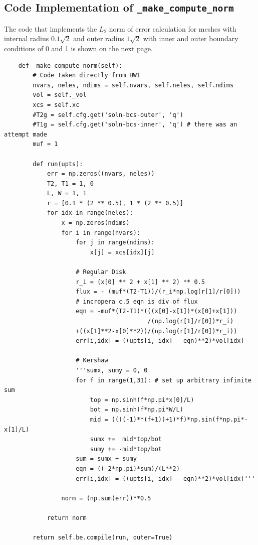 \documentclass[a4paper, 12pt]{article}
\begin{document}
\subsection{Code Implementation of \texttt{\_make\_compute\_norm}}
The code that implements the $L_2$ norm of error calculation for meshes with internal radius $0.1\sqrt{2}$ and outer radius $1\sqrt{2}$ with inner and outer boundary conditions of 0 and 1 is shown on the next page.
\begin{verbatim}
    def _make_compute_norm(self):
        # Code taken directly from HW1
        nvars, neles, ndims = self.nvars, self.neles, self.ndims
        vol = self._vol
        xcs = self.xc
        #T2g = self.cfg.get('soln-bcs-outer', 'q')
        #T1g = self.cfg.get('soln-bcs-inner', 'q') # there was an attempt made
        muf = 1

        def run(upts):
            err = np.zeros((nvars, neles))
            T2, T1 = 1, 0
            L, W = 1, 1
            r = [0.1 * (2 ** 0.5), 1 * (2 ** 0.5)]
            for idx in range(neles):
                x = np.zeros(ndims)
                for i in range(nvars):
                    for j in range(ndims):
                        x[j] = xcs[idx][j]

                    # Regular Disk
                    r_i = (x[0] ** 2 + x[1] ** 2) ** 0.5
                    flux = - (muf*(T2-T1))/(r_i*np.log(r[1]/r[0])) 
                    # incropera c.5 eqn is div of flux
                    eqn = -muf*(T2-T1)*(((x[0]-x[1])*(x[0]+x[1]))
                                        /(np.log(r[1]/r[0])*r_i)
                    +((x[1]**2-x[0]**2))/(np.log(r[1]/r[0])*r_i))
                    err[i,idx] = ((upts[i, idx] - eqn)**2)*vol[idx]

                    # Kershaw
                    '''sumx, sumy = 0, 0
                    for f in range(1,31): # set up arbitrary infinite sum
                        top = np.sinh(f*np.pi*x[0]/L)
                        bot = np.sinh(f*np.pi*W/L)
                        mid = ((((-1)**(f+1))+1)*f)*np.sin(f*np.pi*-x[1]/L)
                        sumx +=  mid*top/bot
                        sumy += -mid*top/bot
                    sum = sumx + sumy
                    eqn = ((-2*np.pi)*sum)/(L**2)
                    err[i,idx] = ((upts[i, idx] - eqn)**2)*vol[idx]'''

                norm = (np.sum(err))**0.5

            return norm

        return self.be.compile(run, outer=True)
\end{verbatim}
\par
\end{document}
